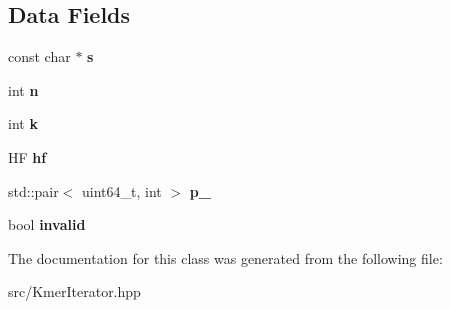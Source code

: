\subsection*{Data Fields}
\begin{DoxyCompactItemize}
\item 
\mbox{\label{classKmerHashIterator_af6d9c03de022b742306cb3aafe3e1fb6}} 
const char $\ast$ {\bfseries s}
\item 
\mbox{\label{classKmerHashIterator_a496105f8a6388e4d0798eb86a703283f}} 
int {\bfseries n}
\item 
\mbox{\label{classKmerHashIterator_a21278124d073333a6ed239069c62f452}} 
int {\bfseries k}
\item 
\mbox{\label{classKmerHashIterator_a3d105eba215d4d0b466bfc78e0ad9621}} 
HF {\bfseries hf}
\item 
\mbox{\label{classKmerHashIterator_ae0b56cf7bffa55739698c58ace815489}} 
std\+::pair$<$ uint64\+\_\+t, int $>$ {\bfseries p\+\_\+}
\item 
\mbox{\label{classKmerHashIterator_ac7b2f1387870f6a9db8d99233955411a}} 
bool {\bfseries invalid}
\end{DoxyCompactItemize}


The documentation for this class was generated from the following file\+:\begin{DoxyCompactItemize}
\item 
src/Kmer\+Iterator.\+hpp\end{DoxyCompactItemize}

